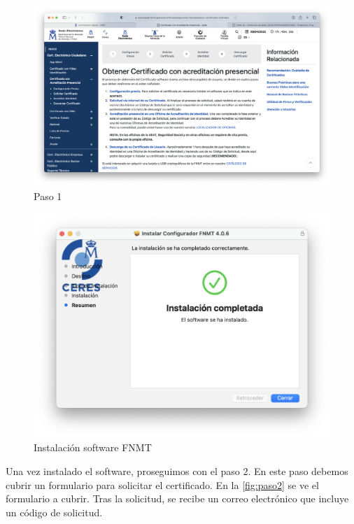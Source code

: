 \begin{figure}[H]   
    \includegraphics[width=\textwidth]{paso1_ej5a.png}
    \caption{Paso 1}
    \label{fig:paso1}
\end{figure}

\begin{figure}[H]   
    \includegraphics[width=\textwidth]{instalacion_FNMT_ej5a.png}
    \caption{Instalación software FNMT}
    \label{fig:instalacion_FNMT}
\end{figure}

Una vez instalado el software, proseguimos con el paso 2. En este paso debemos cubrir un formulario para solicitar el certificado. En la \ref{fig:paso2} se ve el formulario a cubrir. Tras la solicitud, se recibe un correo electrónico que incluye un código de solicitud. 

